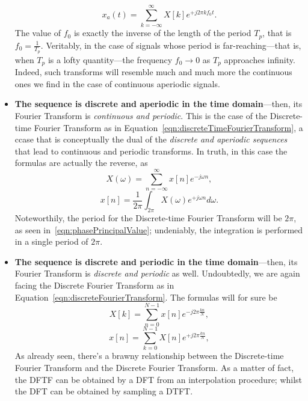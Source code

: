 \documentclass[\documentfontsize, twocolumn]{\classname}
\begin{document}
\begin{itemize}
\begin{equation}
            x_a(t) = \sum_{k=-\infty}^\infty X[k] e^{+j2\pi kf_0t}.
        \end{equation}
        The value of $f_0$ is exactly the inverse of the length of the period $T_p$, that is $f_0 = \frac 1 {T_p}$. Veritably, in the case of signals whose period is far-reaching---that is, when $T_p$ is a lofty quantity---the frequency $f_0 \rightarrow 0$ as $T_p$ approaches infinity. Indeed, such transforms will resemble much and much more the continuous ones we find in the case of continuous aperiodic signals.
    \item \textbf{The sequence is discrete and aperiodic in the time domain}---then, its Fourier Transform is \emph{continuous and periodic}. This is the case of the Discrete-time Fourier Transform as in Equation~\ref{eqn:discreteTimeFourierTransform}, a ccase that is conceptually the dual of the \emph{discrete and aperiodic sequences} that lead to continuous and periodic transforms. In truth, in this case the formulas are actually the reverse, as
        \begin{equation}\label{eqn:fourierTransformDiscreteAperiodic}
            X(\omega) = \sum_{n=-\infty}^\infty x[n] e^{-j\omega n},
        \end{equation}
        \begin{equation}\label{eqn:inverseFourierTransformDiscreteAperiodic}
            x[n] = \frac{1}{2\pi}\int_{2\pi} X(\omega) e^{+j\omega n} d\omega.
        \end{equation}
        Noteworthily, the period for the Discrete-time Fourier Transform will be $2\pi$, as seen in~\ref{eqn:phasePrincipalValue}; undeniably, the integration is performed in a single period of $2\pi$.
    \item \textbf{The sequence is discrete and periodic in the time domain}---then, its Fourier Transform is \emph{discrete and periodic} as well. Undoubtedly, we are again facing the Discrete Fourier Transform as in Equation~\ref{eqn:discreteFourierTransform}. The formulas will for sure be
        \begin{equation}\label{eqn:fourierTransformDiscretePeriodic}
            X[k] = \sum_{n=0}^{N-1} x[n] e^{-j2\pi \frac{kn}{N}},
        \end{equation}
        \begin{equation}\label{eqn:inverseFourierTransformDiscretePeriodic}
            x[n] = \sum_{k=0}^{N-1} X[n] e^{+j2\pi \frac{kn}{N}},
        \end{equation}
        As already seen, there's a brawny relationship between the Discrete-time Fourier Transform and the Discrete Fourier Transform. As a matter of fact, the DFTF can be obtained by a DFT from an interpolation procedure; whilst the DFT can be obtained by sampling a DTFT.
\end{itemize}
\end{document}
